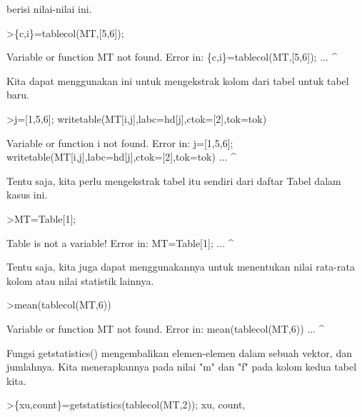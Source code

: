 \documentclass[a4paper,10pt]{article}
\begin{document}
\begin{eulernotebook}
\begin{eulercomment}
berisi nilai-nilai ini.
\end{eulercomment}
\begin{eulerprompt}
>\{c,i\}=tablecol(MT,[5,6]);
\end{eulerprompt}
\begin{euleroutput}
  Variable or function MT not found.
  Error in:
  \{c,i\}=tablecol(MT,[5,6]); ...
                   ^
\end{euleroutput}
\begin{eulercomment}
Kita dapat menggunakan ini untuk mengekstrak kolom dari tabel untuk
tabel baru.
\end{eulercomment}
\begin{eulerprompt}
>j=[1,5,6]; writetable(MT[i,j],labc=hd[j],ctok=[2],tok=tok)
\end{eulerprompt}
\begin{euleroutput}
  Variable or function i not found.
  Error in:
  j=[1,5,6]; writetable(MT[i,j],labc=hd[j],ctok=[2],tok=tok) ...
                            ^
\end{euleroutput}
\begin{eulercomment}
Tentu saja, kita perlu mengekstrak tabel itu sendiri dari daftar Tabel
dalam kasus ini.
\end{eulercomment}
\begin{eulerprompt}
>MT=Table[1];
\end{eulerprompt}
\begin{euleroutput}
  Table is not a variable!
  Error in:
  MT=Table[1]; ...
             ^
\end{euleroutput}
\begin{eulercomment}
Tentu saja, kita juga dapat menggunakannya untuk menentukan nilai
rata-rata kolom atau nilai statistik lainnya.
\end{eulercomment}
\begin{eulerprompt}
>mean(tablecol(MT,6))
\end{eulerprompt}
\begin{euleroutput}
  Variable or function MT not found.
  Error in:
  mean(tablecol(MT,6)) ...
                  ^
\end{euleroutput}
\begin{eulercomment}
Fungsi getstatistics() mengembalikan elemen-elemen dalam sebuah
vektor, dan jumlahnya. Kita menerapkannya pada nilai "m" dan "f" pada
kolom kedua tabel kita.
\end{eulercomment}
\begin{eulerprompt}
>\{xu,count\}=getstatistics(tablecol(MT,2)); xu, count,

\end{eulerprompt}
\end{eulernotebook}
\end{document}
